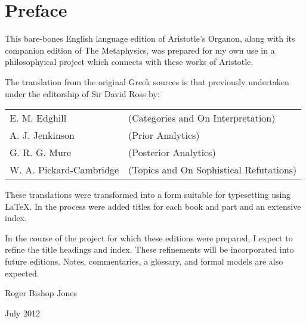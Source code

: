 {\parskip=0pt\tableofcontents}

\vfill

\pagebreak

\chapter*{Preface}

This bare-bones English language edition of Aristotle's Organon, along with its companion edition of The Metaphysics, was prepared for my own use in a philosophyical project which connects with these works of Aristotle.

The translation from the original Greek sources is that previously undertaken under the editorship of Sir David Ross by:

\vspace{0.2in}

\begin{centering}
\begin{tabular}{l l}
E. M. Edghill & (Categories and On Interpretation)\\
A. J. Jenkinson & (Prior Analytics)\\
G. R. G. Mure & (Posterior Analytics)\\
W. A. Pickard-Cambridge & (Topics and On Sophistical Refutations)
\end{tabular}
\end{centering}

\vspace{0.2in}

These translations were transformed into a form suitable for typesetting using {\LaTeX}.
In the process were added titles for each book and part and an extensive index.

In the course of the project for which these editions were prepared, I expect to refine the title headings and index.
These refinements will be incorporated into future editions.
Notes, commentaries, a glossary, and formal models are also expected.

Roger Bishop Jones

July 2012

\mainmatter

\renewcommand{\aref}{Volume \Roman{chapter} Book \Roman{section} Part \arabic{subsection}}

